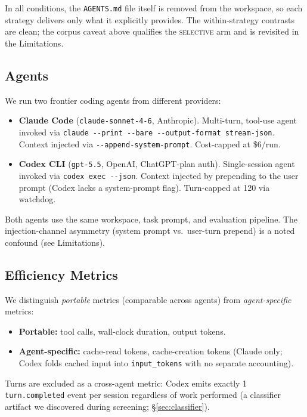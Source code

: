 \documentclass[11pt]{article}
\newcommand{\agentsmd}{\texttt{AGENTS.md}}
\newcommand{\selective}{\textsc{selective}}
\begin{document}
In all conditions, the \agentsmd{} file itself is removed from the workspace, so each strategy delivers only what it explicitly provides.
The within-strategy contrasts are clean; the corpus caveat above qualifies the \selective{} arm and is revisited in the Limitations.

\subsection{Agents}

We run two frontier coding agents from different providers:
\begin{itemize}
    \item \textbf{Claude Code} (\texttt{claude-sonnet-4-6}, Anthropic). Multi-turn, tool-use agent invoked via \texttt{claude -{}-print -{}-bare -{}-output-format stream-json}. Context injected via \texttt{-{}-append-system-prompt}. Cost-capped at \$6/run.
    \item \textbf{Codex CLI} (\texttt{gpt-5.5}, OpenAI, ChatGPT-plan auth). Single-session agent invoked via \texttt{codex exec -{}-json}. Context injected by prepending to the user prompt (Codex lacks a system-prompt flag). Turn-capped at 120 via watchdog.
\end{itemize}

Both agents use the same workspace, task prompt, and evaluation pipeline.
The injection-channel asymmetry (system prompt vs.\ user-turn prepend) is a noted confound (see Limitations).

\subsection{Efficiency Metrics}

We distinguish \emph{portable} metrics (comparable across agents) from \emph{agent-specific} metrics:
\begin{itemize}
    \item \textbf{Portable:} tool calls, wall-clock duration, output tokens.
    \item \textbf{Agent-specific:} cache-read tokens, cache-creation tokens (Claude only; Codex folds cached input into \texttt{input\_tokens} with no separate accounting).
\end{itemize}

Turns are excluded as a cross-agent metric: Codex emits exactly 1 \texttt{turn.completed} event per session regardless of work performed (a classifier artifact we discovered during screening; \S\ref{sec:classifier}).
\end{document}
